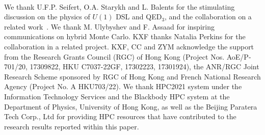 \documentclass[aps,prl,twocolumn,superscriptaddress,showpacs,longbibliography]{revtex4-2}
\newcommand{\qed}{QED$_3$}
\begin{document}

% 
% 
\vspace{1cm}

\\
We thank U.F.P. Seifert, O.A. Starykh and L. Balents for the stimulating discussion on the physics of $U(1)$ DSL and \qed, and the collaboration on a related work~\cite{chenEmergent2025}. We thank M. Ulybyshev and F. Assaad for inspiring communications on hybrid Monte Carlo. KXF thanks Natalia Perkins for the collaboration in a related project. KXF, CC and ZYM acknowledge the support from the Research Grants Council (RGC) of Hong Kong (Project Nos. AoE/P-701/20, 17309822, HKU C7037-22GF,
17302223, 17301924), the ANR/RGC Joint Research Scheme
sponsored by RGC of Hong Kong and French National Research Agency (Project No. A HKU703/22). We thank HPC2021 system under the Information Technology Services and the Blackbody HPC system at the Department of Physics, University of Hong Kong, as well as the Beijing Paratera Tech Corp., Ltd for providing HPC resources that have contributed to the research results reported within this paper. 
\\







\setcounter{equation}{0}
\setcounter{figure}{0}
\setcounter{table}{0}
\setcounter{section}{0}

\makeatletter
\renewcommand{\theequation}{S\arabic{equation}}
\renewcommand{\thefigure}{S\arabic{figure}}
\setcounter{secnumdepth}{3}


\newpage
\end{document}
